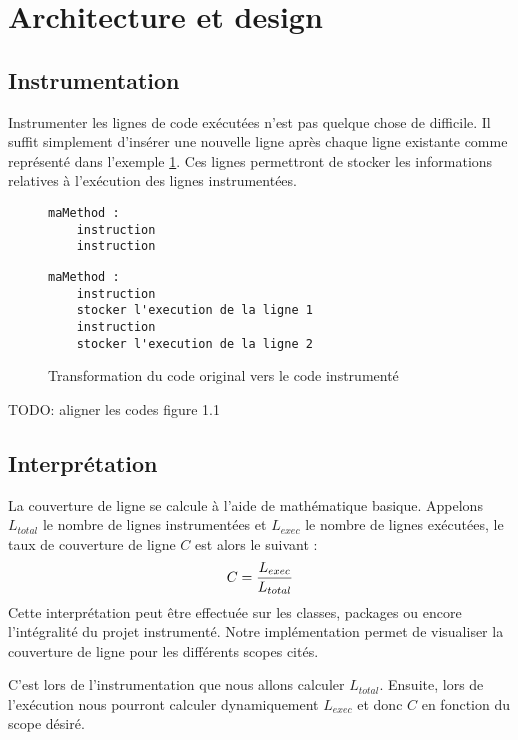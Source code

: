 \section{Architecture et design}

\subsection{Instrumentation}
\label{instrumentation}

Instrumenter les lignes de code exécutées n'est pas quelque chose de difficile. Il suffit simplement d'insérer une nouvelle ligne après chaque ligne existante comme représenté dans l'exemple   \ref{example_instrumentation}. Ces lignes permettront de stocker les informations relatives à l'exécution des lignes instrumentées.

\begin{figure}[h]
\begin{lstlisting}[linewidth=5.0cm]
maMethod :
	instruction
	instruction
\end{lstlisting}
\begin{lstlisting}[linewidth=11cm]
maMethod :
	instruction
	stocker l'execution de la ligne 1
	instruction
	stocker l'execution de la ligne 2
\end{lstlisting}

\caption{Transformation du code original vers le code instrumenté}
\label{example_instrumentation}
\end{figure}

TODO: aligner les codes figure 1.1

\subsection{Interprétation}
\label{interpretation}

La couverture de ligne se calcule à l'aide de mathématique basique. Appelons $L_{total}$ le nombre de lignes instrumentées et $L_{exec}$ le nombre de lignes exécutées, le taux de couverture de ligne $C$ est alors le suivant :
\begin{equation}
C = { L_{exec} \over L_{total} }
\end{equation}
Cette interprétation peut être effectuée sur les classes, packages ou encore l'intégralité du projet instrumenté. Notre implémentation permet de visualiser la couverture de ligne pour les différents scopes cités.
\par C'est lors de l'instrumentation que nous allons calculer $L_{total}$. Ensuite, lors de l'exécution nous pourront calculer dynamiquement $L_{exec}$ et donc $C$ en fonction du scope désiré.

